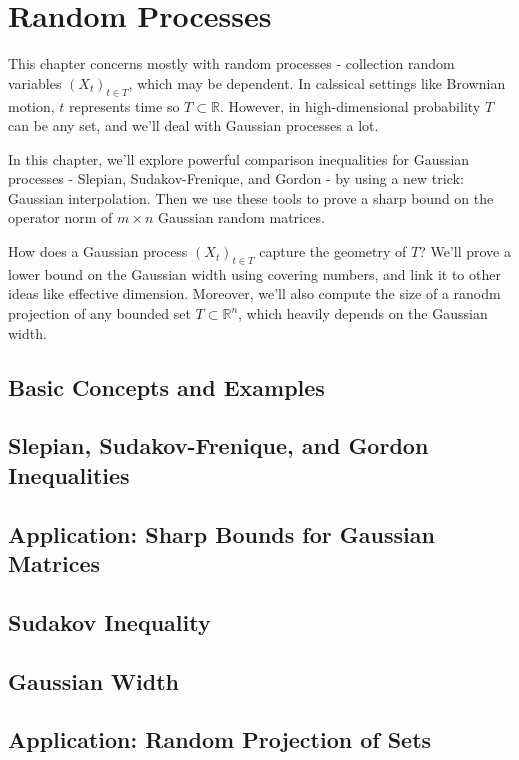 \section{Random Processes}
This chapter concerns mostly with random processes - collection random variables $(X_t)_{t \in T}$, which 
may be dependent. In calssical settings like Brownian motion, $t$ represents time so $T \subset \mathbb{R}$. 
However, in high-dimensional probability $T$ can be any set, and we'll deal with Gaussian processes a lot.

In this chapter, we'll explore powerful comparison inequalities for Gaussian processes - Slepian, 
Sudakov-Frenique, and Gordon - by using a new trick: Gaussian interpolation. Then we use these tools to prove 
a sharp bound on the operator norm of $m \times n$ Gaussian random matrices.

How does a Gaussian process $(X_t)_{t \in T}$ capture the geometry of $T$? We'll prove a lower bound on the 
Gaussian width using covering numbers, and link it to other ideas like effective dimension. Moreover, we'll 
also compute the size of a ranodm projection of any bounded set $T \subset \mathbb{R}^n$, which heavily depends 
on the Gaussian width.



\subsection{Basic Concepts and Examples}



\subsection{Slepian, Sudakov-Frenique, and Gordon Inequalities}



\subsection{Application: Sharp Bounds for Gaussian Matrices}



\subsection{Sudakov Inequality}



\subsection{Gaussian Width}



\subsection{Application: Random Projection of Sets}
